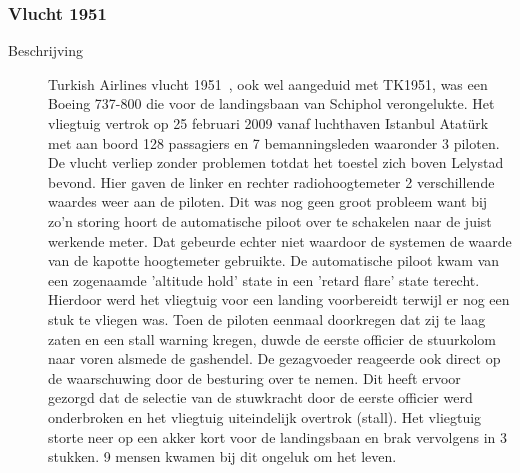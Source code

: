 \documentclass{article}
\begin{document}
\subsubsection{Vlucht 1951}
\begin{description}
\item[Beschrijving]
Turkish Airlines vlucht 1951~\cite{neergestorttijdensnadering}, ook wel aangeduid met TK1951, was een Boeing 737-800 die voor de landingsbaan van Schiphol verongelukte. Het vliegtuig vertrok op 25 februari 2009 vanaf luchthaven Istanbul Atatürk met aan boord 128 passagiers en 7 bemanningsleden waaronder 3 piloten. De vlucht verliep zonder problemen totdat het toestel zich boven Lelystad bevond. Hier gaven de linker en rechter radiohoogtemeter 2 verschillende waardes weer aan de piloten. Dit was nog geen groot probleem want bij zo'n storing hoort de automatische piloot over te schakelen naar de juist werkende meter. Dat gebeurde echter niet waardoor de systemen de waarde van de kapotte hoogtemeter gebruikte. De automatische piloot kwam van een zogenaamde 'altitude hold' state in een 'retard flare' state terecht. Hierdoor werd het vliegtuig voor een landing voorbereidt terwijl er nog een stuk te vliegen was. Toen de piloten eenmaal doorkregen dat zij te laag zaten en een stall warning kregen, duwde de eerste officier de stuurkolom naar voren alsmede de gashendel. De gezagvoeder reageerde ook direct op de waarschuwing door de besturing over te nemen. Dit heeft ervoor gezorgd dat de selectie van de stuwkracht door de eerste officier werd onderbroken en het vliegtuig uiteindelijk overtrok (stall). Het vliegtuig storte neer op een akker kort voor de landingsbaan en brak vervolgens in 3 stukken. 9 mensen kwamen bij dit ongeluk om het leven.


\end{description}
\end{document}
